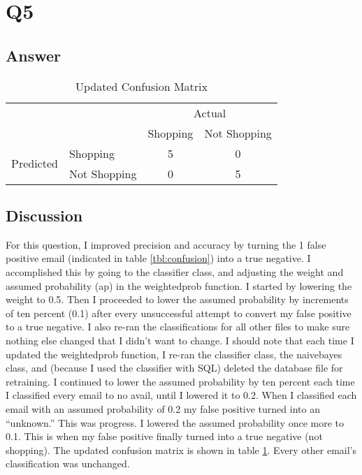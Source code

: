 \documentclass[12pt]{article}
\begin{document}
\section*{Q5}

\subsection*{Answer}

\begin{table}[h]
\centering
\caption{Updated Confusion Matrix}
\label{tbl:newconfusion}
\begin{tabular}{l|l|c|c|}
\multicolumn{2}{c}{}&\multicolumn{2}{c}{Actual}\\
\cline{3-4}
\multicolumn{2}{c|}{}&Shopping&Not Shopping\\
\cline{2-4}
\multirow{2}{*}{Predicted}& Shopping & 5  & 0 \\
\cline{2-4}
& Not Shopping & 0  & 5  \\
\cline{2-4}
\end{tabular}
\end{table}

\subsection*{Discussion}
For this question, I improved precision and accuracy by turning the 1 false positive email (indicated in table \ref{tbl:confusion}) into a true negative.  I accomplished this by going to the classifier class, and adjusting the weight and assumed probability (ap) in the weightedprob function.  I started by lowering the weight to 0.5.  Then I proceeded to lower the assumed probability by increments of ten percent (0.1) after every unsuccessful attempt to convert my false positive to a true negative.  I also re-ran the classifications for all other files to make sure nothing else changed that I didn't want to change.  I should note that each time I updated the weightedprob function, I re-ran the classifier class, the naivebayes class, and (because I used the classifier with SQL) deleted the database file for retraining.  I continued to lower the assumed probability by ten percent each time I classified every email to no avail, until I lowered it to 0.2.  When I classified each email with an assumed probability of 0.2 my false positive turned into an ``unknown.''  This was progress.  I lowered the assumed probability once more to 0.1.  This is when my false positive finally turned into a true negative (not shopping).  The updated confusion matrix is shown in table \ref{tbl:newconfusion}.  Every other email's classification was unchanged.
\end{document}
